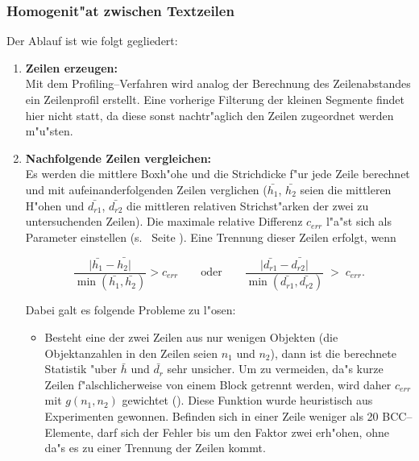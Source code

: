 \subsubsection{Homogenit"at zwischen Textzeilen}
Der Ablauf ist wie folgt gegliedert:
\begin{enumerate}
  \item {\bf Zeilen erzeugen:}\\
        Mit dem Profiling--Verfahren wird analog der Berechnung des Zeilenabstandes ein Zeilenprofil
        erstellt. Eine vorherige Filterung der kleinen Segmente findet hier nicht statt, da
        diese sonst nachtr"aglich den Zeilen zugeordnet werden m"u"sten.
  \item {\bf Nachfolgende Zeilen vergleichen:}\\
        Es werden die mittlere Boxh"ohe und die Strichdicke f"ur jede Zeile berechnet und mit
        aufeinanderfolgenden Zeilen verglichen
        ($\bar{h_1}$, $\bar{h_2}$ seien die mittleren H"ohen und $\bar{d_{r1}}$, $\bar{d_{r2}}$ die
        mittleren relativen Strichst"arken der zwei zu untersuchenden Zeilen). Die
        maximale relative Differenz $c_{err}$ l"a"st sich als Parameter einstellen
        (s.\  Seite \pageref{eps:ParameterPanelSplit}).
        Eine Trennung dieser Zeilen erfolgt, wenn

        $$\frac{|\bar{h_1}-\bar{h_2|}}{\min (\bar{h_1},\bar{h_2})} > c_{err}
          \qquad\mbox{oder}\qquad
          \frac{|\bar{d_{r1}}-\bar{d_{r2}|}}{\min (\bar{d_{r1}},\bar{d_{r2}})} \;>\; c_{err}.$$

        Dabei galt es folgende Probleme zu l"osen:
        \begin{itemize}
          \item Besteht eine der zwei Zeilen aus nur wenigen Objekten
                (die Objektanzahlen in den Zeilen seien $n_1$ und $n_2$), dann ist die berechnete
                Statistik "uber $\bar{h}$ und $\bar{d_r}$ sehr unsicher. Um zu vermeiden, da"s kurze Zeilen
                f"alschlicherweise von einem Block getrennt werden, wird daher $c_{err}$ mit $g(n_1,n_2)$
                gewichtet ().
                Diese Funktion wurde heuristisch aus Experimenten gewonnen. Befinden sich
                in einer Zeile weniger als 20 BCC--Elemente, darf sich der Fehler bis um den Faktor zwei
                erh"ohen, ohne da"s es zu einer Trennung der Zeilen kommt.



\end{itemize}
\end{enumerate}
